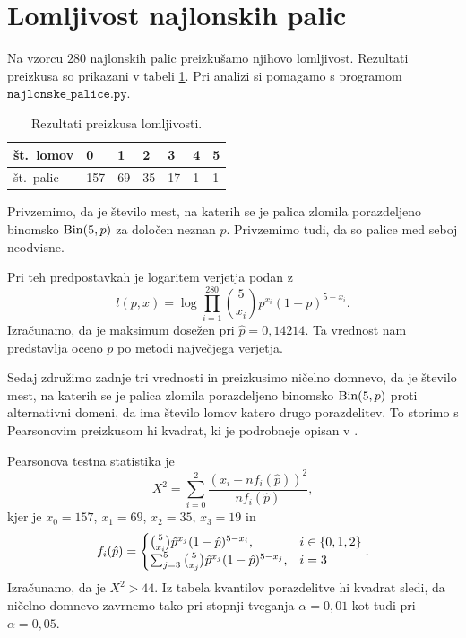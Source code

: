 \documentclass[12pt, a4paper]{article}
\begin{document}
\section{Lomljivost najlonskih palic}
Na vzorcu $280$ najlonskih palic preizkušamo njihovo lomljivost. Rezultati 
preizkusa so prikazani v tabeli \ref{table:lomljivost}. Pri analizi 
si pomagamo s programom $\texttt{najlonske\_palice.py}$.
\begin{table}[H]
    \centering
    \begin{tabular}{|l||l|l|l|l|l|l|}
        \hline
        št.~lomov & 0   & 1  & 2  & 3  & 4 & 5 \\ \hline
        št.~palic & 157 & 69 & 35 & 17 & 1 & 1 \\ \hline
    \end{tabular}
    \caption{Rezultati preizkusa lomljivosti.}
    \label{table:lomljivost}
\end{table}
Privzemimo, da je število mest, na katerih se je palica 
zlomila porazdeljeno binomsko $\operatorname{Bin}(5, p)$ za določen neznan $p$.
Privzemimo tudi, da so palice med seboj neodvisne.


Pri teh predpostavkah je logaritem verjetja podan z
\[
    l(p, x) = \log\prod_{i=1}^{280} \binom{5}{x_i}p^{x_i}(1-p)^{5-x_i}.
\]
Izračunamo, da je maksimum 
dosežen pri $\hat p = 0{,}14214$. Ta vrednost
nam predstavlja oceno $p$ po metodi največjega verjetja.


Sedaj združimo zadnje tri vrednosti in preizkusimo ničelno domnevo, da 
je število mest, na katerih se je palica zlomila porazdeljeno 
binomsko $\operatorname{Bin}(5, p)$ proti alternativni domeni, da ima število 
lomov katero drugo porazdelitev.
To storimo s Pearsonovim preizkusom hi kvadrat, ki je podrobneje
opisan v \cite[Poglavje~9.5]{rice2007mathematical}.

Pearsonova testna statistika je
\[
    X^2 = \sum_{i=0}^{2}\frac{(x_i - nf_i(\hat p))^2}{nf_i(\hat p)},
\]
kjer je $x_0 = 157$, $x_1 = 69$, $x_2 = 35$, $x_3 = 19$ in
\[
    f_i(\hat p) = \begin{cases}
        \binom{5}{x_i}\hat p^{x_j}(1-\hat p)^{5-x_i}, &i \in \left\{0,1,2\right\} \\
        \sum_{j=3}^{5} \binom{5}{x_j}\hat p^{x_j}(1-\hat p)^{5-x_j}, &i = 3 
    \end{cases}.
\]
Izračunamo, da je $X^2 > 44$. Iz tabela kvantilov porazdelitve 
hi kvadrat sledi, da ničelno domnevo zavrnemo tako 
pri stopnji tveganja $\alpha = 0{,}01$ kot tudi pri $\alpha = 0{,}05$. 
\end{document}
